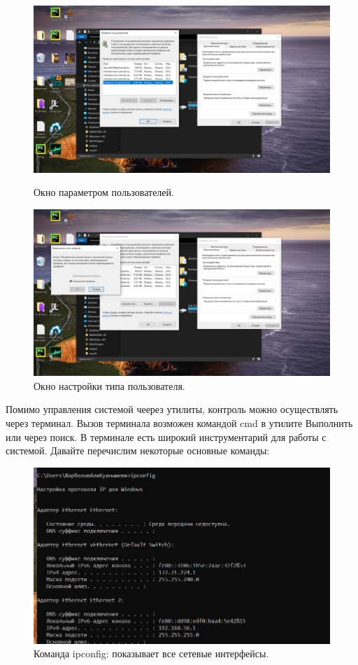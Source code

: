 \begin{figure}[h!]
    \centering
    \begin{minipage}[p]{0.45\linewidth}
    \centering
    \includegraphics[width=1\linewidth]{Pic/lab1/photo_2025-05-21_08-15-31.jpg}
    \caption{Окно параметром пользователей.}
    \label{fig:usersparam}
    \end{minipage}
    \hfill
    \begin{minipage}[p]{0.45\linewidth}
    \centering
    \includegraphics[width=1\linewidth]{Pic/lab1/photo_2025-05-21_08-15-29.jpg}
    \caption{Окно настройки типа пользователя.}
    \label{fig:userstype}
    \end{minipage}
\end{figure}

Помимо управления системой чеерез утилиты, контроль можно осуществлять через терминал. Вызов терминала возможен командой cmd в утилите Выполнить или через поиск. В терминале есть широкий инструментарий для работы с системой. Давайте перечислим некоторые основные команды:
\begin{figure}[h!]
    \centering
    \includegraphics[width=0.5\linewidth]{Pic/lab1/photo_2025-05-21_08-15-33.jpg}
    \caption{Команда ipconfig: показывает все сетевые интерфейсы.}
    \label{fig:enter-label}
\end{figure}

